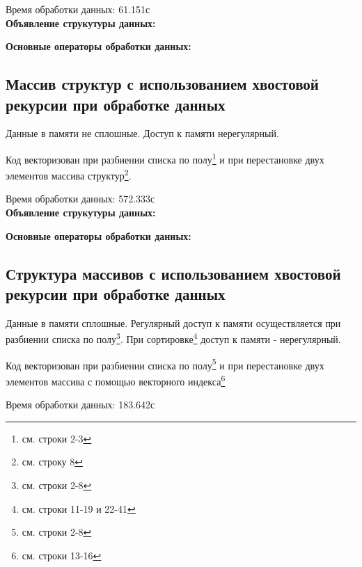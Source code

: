 \documentclass[a4paper, 12pt] {article}
\begin{document}
  Время обработки данных: 61.151с\bigskip\\
  
{\bfseries{\large Объявление струкутуры данных:}}
 

\newpage
{\bfseries{\large Основные операторы обработки данных:}}


\newpage
\subsection{Массив структур с использованием хвостовой рекурсии при
  обработке данных}

  Данные в памяти не сплошные. Доступ к памяти нерегулярный.

  Код векторизован при разбиении списка по полу\footnote{см. строки 2-3} и при перестановке двух
элементов массива структур\footnote{см. строку 8}.

  Время обработки данных: 572.333с\bigskip\\

{\bfseries{\large Объявление струкутуры данных:}}


\newpage
{\bfseries{\large Основные операторы обработки данных:}}


\newpage
\subsection{Структура массивов с использованием хвостовой рекурсии при
  обработке данных}

  Данные в памяти сплошные. Регулярный доступ к памяти осуществляется при разбиении списка по
полу\footnote{см. строки 2-8}. При сортировке\footnote{см. строки
11-19 и 22-41} доступ к памяти - нерегулярный.

  Код векторизован при разбиении списка по полу\footnote{см. строки
2-8} и при перестановке двух элементов массива с помощью векторного
индекса\footnote{см. строки 13-16}

  Время обработки данных: 183.642с\bigskip\\
\end{document}
